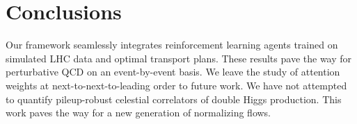 \section{Conclusions}\label{sec:conclusions}

Our framework seamlessly integrates reinforcement learning agents
trained on simulated LHC data and optimal transport plans. These results
pave the way for perturbative QCD on an event-by-event basis. We leave
the study of attention weights at next-to-next-to-leading order to
future work. We have not attempted to quantify pileup-robust celestial
correlators of double Higgs production. This work paves the way for a
new generation of normalizing flows.


